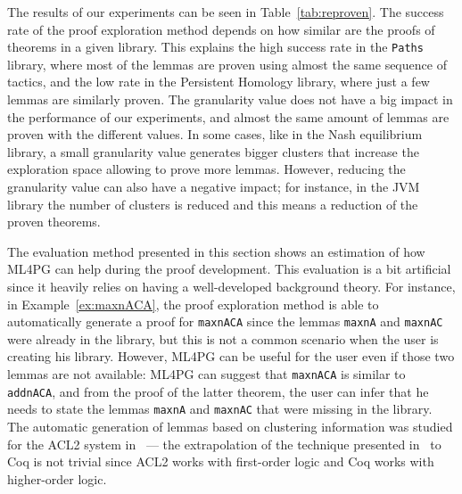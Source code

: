 The results of our experiments can be seen in Table~\ref{tab:reproven}. The success rate of the proof exploration method 
depends on how similar are the proofs of theorems in a given library. This explains the high success rate in the \lstinline?Paths?
library, where most of the lemmas are proven using almost the same sequence of tactics, and the low rate in the Persistent Homology 
library, where just a few lemmas are similarly proven. The granularity value does not have a big impact in the performance of 
our experiments, and almost the same amount of lemmas are proven with the different values. In some cases, like in the Nash equilibrium
library, a small granularity value generates bigger clusters that increase the exploration space allowing to prove more lemmas. 
However, reducing the granularity value can also have a negative impact; for instance, in the JVM library the number of clusters
is reduced and this means a reduction of the proven theorems. 

The evaluation method presented in this section shows an estimation of how ML4PG can help during the proof development. 
This evaluation is a bit artificial since it heavily relies on having a well-developed background theory. For instance, 
in Example~\ref{ex:maxnACA}, the proof exploration method is able to automatically generate a proof for \lstinline?maxnACA? since
the lemmas \lstinline?maxnA? and \lstinline?maxnAC? were already in the library, but this is not a common scenario when the user
is creating his library. However, ML4PG can be useful for the user even if those two lemmas are not available: ML4PG can suggest
that \lstinline?maxnACA? is similar to  \lstinline?addnACA?, and from the proof of the latter theorem, the user can infer that he needs
to state the lemmas \lstinline?maxnA? and \lstinline?maxnAC? that were missing in the library. The automatic generation of lemmas based
on clustering information was studied for the ACL2 system in~\cite{lpar13} --- the extrapolation of the technique presented in~\cite{lpar13} to Coq is not trivial since ACL2 works with first-order logic and Coq works with higher-order logic. 



% 



